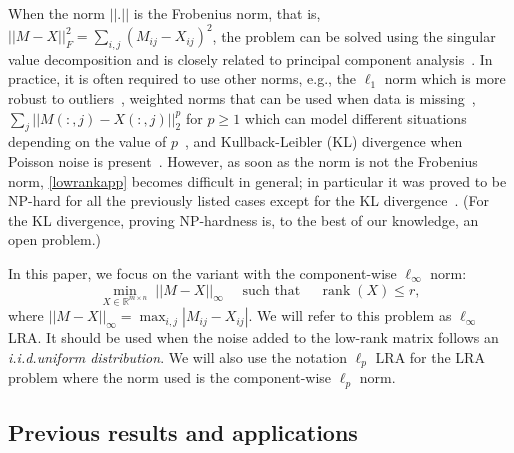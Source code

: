 \documentclass[a4paper,11pt]{article}
\numberwithin{equation}{section}
\DeclareMathOperator{\rank}{rank}
\begin{document}
When the norm $||.||$ is the Frobenius norm, that is, $||M - X||_F^2 = \sum_{i,j} (M_{ij}-X_{ij})^2$, 
the problem can be solved using the singular value decomposition and is closely related to principal component analysis~\cite{golub2012matrix}. 
In practice, it is often required to use other norms, e.g., 
the $\ell_1$ norm which is more robust to outliers~\cite{SWZ17}, 
weighted norms that can be used when data is missing~\cite{GZ79, KBV09}, 
$\sum_j ||M(:,j)-X(:,j)||_2^p$ for $p \geq 1$ which can model different situations depending on the value of $p$~\cite{CW15}, and 
Kullback-Leibler (KL) divergence when Poisson noise is present~\cite{chi2012tensors}. 
However, as soon as the norm is not the Frobenius norm, \eqref{lowrankapp}  
becomes difficult in general; 
in particular it was proved to be NP-hard for all the previously listed cases except for the KL divergence~\cite{GV15c, GG10c, SWZ17}. 
(For the KL divergence, proving NP-hardness is, to the best of our knowledge, an open problem.)  

In this paper, we focus on the variant with the component-wise $\ell_{\infty}$ norm: 
\begin{equation}  \label{lowrankinf}
\min_{X \in \mathbb{R}^{m \times n}} \; ||M - X||_{\infty} \quad \text{ such that } \quad \rank(X) \leq r, 
\end{equation} 
where $||M - X||_{\infty}  = \max_{i,j} |M_{ij} - X_{ij}|$. We will refer to this problem as $\ell_{\infty}$ LRA. It should be used when the noise added to the low-rank matrix follows an \emph{i.i.d.\@ uniform distribution}. We will also use the notation $\ell_p$ LRA for the LRA problem where the norm used is the component-wise $\ell_p$ norm. 

\subsection{Previous results and applications}
\end{document}
